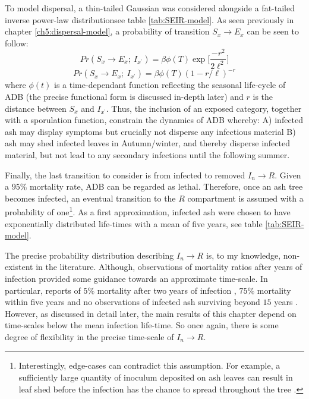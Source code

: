 To model dispersal, a thin-tailed Gaussian was considered alongside a fat-tailed inverse power-law distribution\textemdash see table \ref{tab:SEIR-model}. As seen previously in chapter \ref{ch5:dispersal-model}, a probability of transition $S_x \rightarrow E_x$ can be seen to follow:
\begin{equation}
    Pr(S_{x} \rightarrow E_{x} ;\ I_{x^{\prime}} ) = \beta  \phi(T) \exp\Big[\frac{-r^2}{2\ell^2}\Big] 
\end{equation}
\begin{equation}
    Pr(S_{x} \rightarrow E_{x} ;\ I_{x^{\prime}} ) = \beta \phi(T) (1 - r/\ell)^{-r}
\end{equation}
where $\phi(t)$ is a time-dependant function reflecting the seasonal life-cycle of ADB (the precise functional form is discussed in-depth later) and $r$ is the distance between $S_x$ and $I_{x^\prime}$. Thus, the inclusion of an exposed category, together with a sporulation function, constrain the dynamics of ADB whereby: A) infected ash may display symptoms but crucially not disperse any infectious material B) ash may shed infected leaves in Autumn/winter, and thereby disperse infected material, but not lead to any secondary infections until the following summer.

Finally, the last transition to consider is from infected to removed $I_{n}\rightarrow R$. Given a $95\%$ mortality rate, ADB can be regarded as lethal. Therefore, once an ash tree becomes infected, an eventual transition to the $R$ compartment is assumed with a probability of one\footnote{Interestingly, edge-cases can contradict this assumption. For example, a sufficiently large quantity of inoculum deposited on ash leaves can result in leaf shed before the infection has the chance to spread throughout the tree \cite{https://doi.org/10.1111/mpp.12073}.}. As a first approximation, infected ash were chosen to have exponentially distributed life-times with a mean of five years, see table \ref{tab:SEIR-model}. 

The precise probability distribution describing $I_{n}\rightarrow R$ is, to my knowledge, non-existent in the literature. Although, observations of mortality ratios after years of infection provided some guidance towards an approximate time-scale. In particular, reports of $5\%$ mortality after two years of infection \cite{kessler2012dieback}, $75\%$ mortality within five years \cite{langer2015ash} and no observations of infected ash surviving beyond $15$ years \cite{wylder2018evidence}. However, as discussed in detail later, the main results of this chapter depend on time-scales below the mean infection life-time. So once again, there is some degree of flexibility in the precise time-scale of $I_{n}\rightarrow R$.


